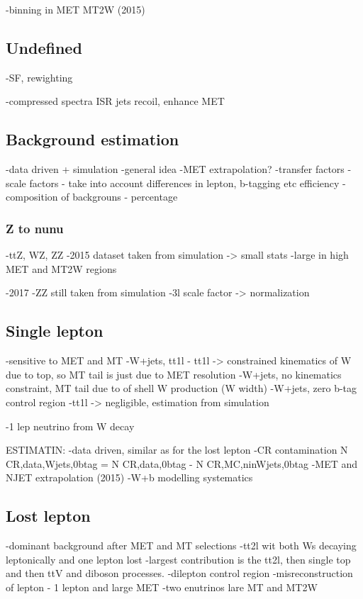 -binning in
	MET
	MT2W (2015)
	

\subsection{Undefined}
-SF, rewighting

-compressed spectra
	ISR jets
	recoil, enhance MET

\subsection{Background estimation}

-data driven + simulation
-general idea
-MET extrapolation?
-transfer factors
-scale factors - take into account differences in lepton, b-tagging etc efficiency
-composition of backgrouns - percentage

\subsubsection{Z to nunu}

-ttZ, WZ, ZZ
-2015 dataset taken from simulation -> small stats
-large in high MET and MT2W regions

-2017
-ZZ still taken from simulation
-3l scale factor -> normalization

\subsection{Single lepton}

-sensitive to MET and MT
-W+jets, tt1l
- tt1l -> constrained kinematics of W due to top, so MT tail is just due to MET resolution
-W+jets, no kinematics constraint, MT tail due to of shell W production (W width) 
-W+jets, zero b-tag control region
-tt1l -> negligible, estimation from simulation

-1 lep neutrino from W decay

ESTIMATIN:
-data driven, similar as for the lost lepton
-CR contamination N CR,data,Wjets,0btag = N CR,data,0btag - N CR,MC,ninWjets,0btag
-MET and NJET extrapolation (2015)
-W+b modelling systematics

\subsection{Lost lepton}

-dominant background after MET and MT selections
-tt2l wit both Ws decaying leptonically and one lepton lost
-largest contribution is the tt2l, then single top and then ttV and diboson processes.
-dilepton control region
-misreconstruction of lepton - 1 lepton and large MET
-two enutrinos lare MT and MT2W

